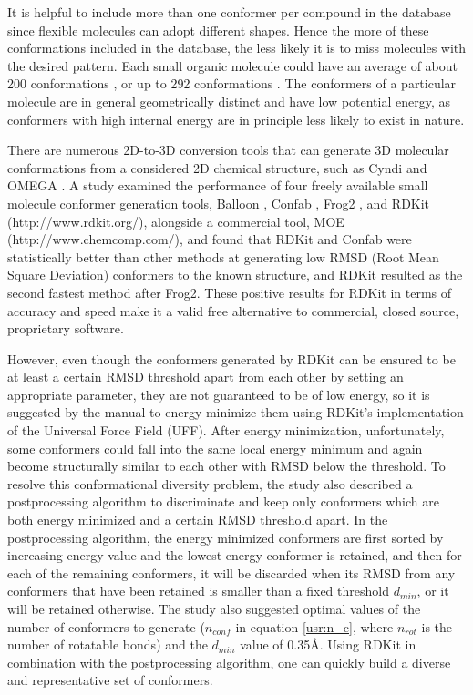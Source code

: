 It is helpful to include more than one conformer per compound in the database since flexible molecules can adopt different shapes. Hence the more of these conformations included in the database, the less likely it is to miss molecules with the desired pattern. Each small organic molecule could have an average of about 200 conformations \citep{1332}, or up to 292 conformations \citep{1280}. The conformers of a particular molecule are in general geometrically distinct and have low potential energy, as conformers with high internal energy are in principle less likely to exist in nature.

There are numerous 2D-to-3D conversion tools that can generate 3D molecular conformations from a considered 2D chemical structure, such as Cyndi \citep{1393,1394} and OMEGA \citep{462}. A study \citep{1127} examined the performance of four freely available small molecule conformer generation tools, Balloon \citep{1442}, Confab \citep{1443}, Frog2 \citep{1444}, and RDKit (http://www.rdkit.org/), alongside a commercial tool, MOE (http://www.chemcomp.com/), and found that RDKit and Confab were statistically better than other methods at generating low RMSD (Root Mean Square Deviation) conformers to the known structure, and RDKit resulted as the second fastest method after Frog2. These positive results for RDKit in terms of accuracy and speed make it a valid free alternative to commercial, closed source, proprietary software.

However, even though the conformers generated by RDKit can be ensured to be at least a certain RMSD threshold apart from each other by setting an appropriate parameter, they are not guaranteed to be of low energy, so it is suggested by the manual to energy minimize them using RDKit's implementation of the Universal Force Field (UFF). After energy minimization, unfortunately, some conformers could fall into the same local energy minimum and again become structurally similar to each other with RMSD below the threshold. To resolve this conformational diversity problem, the study \citep{1127} also described a postprocessing algorithm to discriminate and keep only conformers which are both energy minimized and a certain RMSD threshold apart. In the postprocessing algorithm, the energy minimized conformers are first sorted by increasing energy value and the lowest energy conformer is retained, and then for each of the remaining conformers, it will be discarded when its RMSD from any conformers that have been retained is smaller than a fixed threshold $d_{min}$, or it will be retained otherwise. The study \citep{1127} also suggested optimal values of the number of conformers to generate ($n_{conf}$ in equation \eqref{usr:n_c}, where $n_{rot}$ is the number of rotatable bonds) and the $d_{min}$ value of 0.35\AA. Using RDKit in combination with the postprocessing algorithm, one can quickly build a diverse and representative set of conformers.

